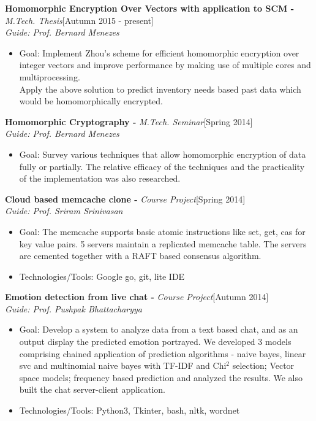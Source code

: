 \documentclass[a4paper,10pt]{article}
\newcommand{\header}[1]{
\begin{center}
\fbox{\begin{minipage}{\textwidth}
\raggedright \large \bf #1
\end{minipage}}
\end{center}
\vspace{-0.3cm}
}
\begin{document}
\vspace{-0.4cm}
\header{Post Graduate Research/Projects}
\vspace{0.2cm}
\begingroup
\linespread{0.5}
\textbf{Homomorphic Encryption Over Vectors with application to SCM -} \emph{M.Tech. Thesis}\hfill[Autumn 2015 - present] \\
\emph{Guide: Prof. Bernard Menezes}
\begin{itemize}
 \item Goal: Implement Zhou's scheme for efficient homomorphic encryption over 
integer vectors and improve performance by making use of multiple cores and multiprocessing.\\
Apply the above solution to predict inventory needs based past data which would be homomorphically encrypted.
\end{itemize}

\noindent
\textbf{Homomorphic Cryptography -} \emph{M.Tech. Seminar}\hfill[Spring 2014] \\
\emph{Guide: Prof. Bernard Menezes}
\begin{itemize}
 \item Goal: Survey various techniques that allow homomorphic encryption of data fully or partially. The relative efficacy of the techniques and the practicality of the implementation was also researched.
\end{itemize}

\noindent
\textbf{Cloud based memcache clone -} \emph{Course Project}\hfill[Spring 2014] \\
\emph{Guide: Prof. Sriram Srinivasan}
\begin{itemize}
 \item Goal: The memcache supports basic atomic instructions like set, get, cas for key value pairs. 5 servers maintain a replicated memcache table. The servers are cemented together with a RAFT based consensus algorithm.
 \item Technologies/Tools: Google go, git, lite IDE
\end{itemize}

\noindent
\textbf{Emotion detection from live chat -} \emph{Course Project}\hfill[Autumn 2014] \\
\emph{Guide: Prof. Pushpak Bhattacharyya}
\begin{itemize}
 \item Goal: Develop a system to analyze data from a text based chat, and as an output display the predicted emotion portrayed. We developed 3 models comprising chained application of prediction algorithms - naive bayes, linear svc and multinomial naive bayes with TF-IDF and Chi$^2$ selection; Vector space models; frequency based prediction and analyzed the results. We also built the chat server-client application.
 \item Technologies/Tools: Python3, Tkinter, bash, nltk, wordnet
\end{itemize}
\end{document}
